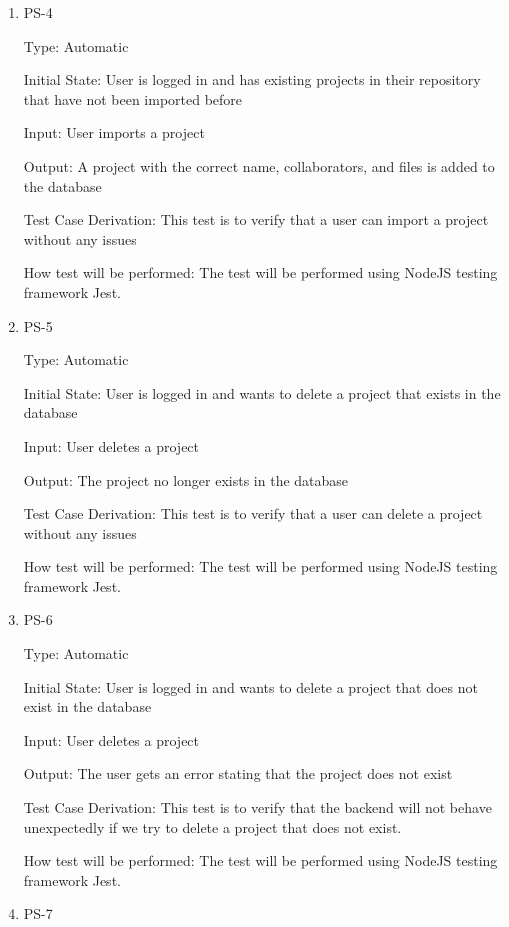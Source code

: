 \documentclass[12pt, titlepage]{article}
\begin{document}
\begin{enumerate}
		\item{PS-4\\}
		
		Type: Automatic
		
		Initial State: User is logged in and has existing projects in their repository that have not been imported before
		
		Input: User imports a project
		
		Output: A project with the correct name, collaborators, and files is added to the database
		
		Test Case Derivation: This test is to verify that a user can import a project without any issues
		
		How test will be performed: The test will be performed using NodeJS testing framework Jest.
		
		\item{PS-5\\}
		
		Type: Automatic
		
		Initial State: User is logged in and wants to delete a project that exists in the database
		
		Input: User deletes a project
		
		Output: The project no longer exists in the database
		
		Test Case Derivation: This test is to verify that a user can delete a project without any issues
		
		How test will be performed: The test will be performed using NodeJS testing framework Jest.
		
		\item{PS-6\\}
		
		Type: Automatic
		
		Initial State: User is logged in and wants to delete a project that does not exist in the database
		
		Input: User deletes a project
		
		Output: The user gets an error stating that the project does not exist
		
		Test Case Derivation: This test is to verify that the backend will not behave unexpectedly if we try to delete a project that does not exist.
		
		How test will be performed: The test will be performed using NodeJS testing framework Jest.
		
		\item{PS-7\\}
		

\end{enumerate}
\end{document}
